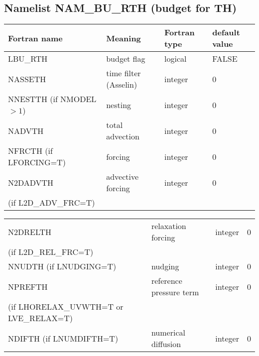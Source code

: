 \subsection{Namelist NAM\_BU\_RTH (budget for TH)}
\begin{center}
\begin{tabular} {|p{8cm}|p{4cm}|>{\centering}p{1.5cm}|p{1.5cm}<{\centering}|}
\hline
Fortran name & Meaning & Fortran type & default value \\
\hline\hline
LBU\_RTH & budget flag & logical & FALSE\index{LBU\_RTH!\innam{NAM\_BU\_RTH}} \\\hline
NASSETH  & time filter (Asselin)   & integer  &  0 \index{NASSETH!\innam{NAM\_BU\_RTH}} \\\hline
NNESTTH (if NMODEL$>1$) & nesting           & integer  &  0 \index{NNESTTH!\innam{NAM\_BU\_RTH}} \\\hline
NADVTH   & total advection   & integer  &  0 \index{NADVTH!\innam{NAM\_BU\_RTH}}\\\hline
NFRCTH (if LFORCING=T)   & forcing           & integer  &  0 \index{NFRCTH!\innam{NAM\_BU\_RTH}} \\\hline
N2DADVTH   &advective forcing           & integer  &  0 \index{N2DADVTH!\innam{NAM\_BU\_RTH}} \\
(if L2D\_ADV\_FRC=T) &  &   &   \\\hline
\end{tabular}
\begin{tabular} {|p{8cm}|p{4cm}|>{\centering}p{1.5cm}|p{1.5cm}<{\centering}|}
\hline
N2DRELTH   & relaxation forcing           & integer  &  0 \index{N2DRLETH!\innam{NAM\_BU\_RTH}} \\
(if L2D\_REL\_FRC=T) &  &   &   \\\hline
NNUDTH (if LNUDGING=T)  & nudging           & integer  &  0 \index{NNUDTH!\innam{NAM\_BU\_RTH}} \\\hline
NPREFTH  & reference pressure term  & integer  &  0 \index{NPREFTH!\innam{NAM\_BU\_RTH}} \\ 
(if LHORELAX\_UVWTH=T or LVE\_RELAX=T) &  &   &   \\\hline
NDIFTH (if LNUMDIFTH=T)   & numerical diffusion & integer  &  0 \index{NDIFTH!\innam{NAM\_BU\_RTH}}\\\hline

\end{tabular}
\end{center}
